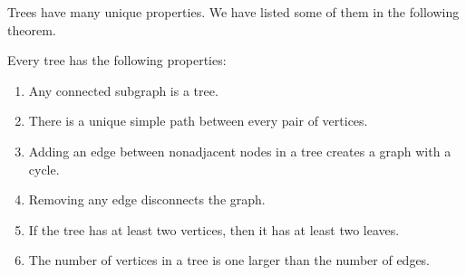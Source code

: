 Trees have many unique properties.  We have listed some of them in the
following theorem.

\begin{theorem}\label{th:treeprops}
Every tree has the following properties:

\begin{enumerate}

\item Any connected subgraph is a tree.\label{asub}

\item There is a unique simple path between every pair of vertices.

\item Adding an edge between nonadjacent nodes in a tree creates a
  graph with a cycle.

\item Removing any edge disconnects the graph.

\item If the tree has at least two vertices, then it has at least two
  leaves.

\item The number of vertices in a tree is one larger than the number
  of edges.

\end{enumerate}
\end{theorem}

